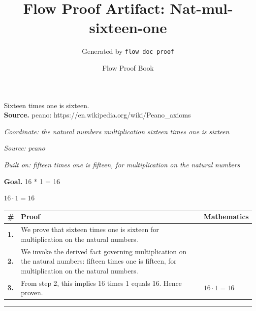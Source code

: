\documentclass[11pt]{article}
\title{Flow Proof Artifact: Nat-mul-sixteen-one}
\author{Generated by \texttt{flow doc proof}}
\date{Flow Proof Book}
\theoremstyle{definition}
\begin{document}
\maketitle
Sixteen times one is sixteen.\\[0.5em]
\textbf{Source.} peano: https://en.wikipedia.org/wiki/Peano\_axioms\\[0.5em]
\bigskip
{}\par
\smallskip\noindent\textit{Coordinate: the natural numbers \cdot multiplication \cdot sixteen times one is sixteen}\par
\smallskip\noindent\textit{Source: peano}\par
\smallskip\noindent\textit{Built on: fifteen times one is fifteen, for multiplication on the natural numbers}\par
\medskip
\noindent\textbf{Goal.} 16 * 1 = 16\par
\noindent$\displaystyle 16 \cdot 1 = 16$\par
\medskip
\noindent
\begin{tabular}{@{} >{\raggedright\arraybackslash}p{} >{\raggedright\arraybackslash}p{} >{\raggedleft\arraybackslash}p{} @{}}
\textbf{\#} & \textbf{Proof} & \textbf{Mathematics} \\
\midrule
\textbf{1.} & We prove that sixteen times one is sixteen for multiplication on the natural numbers. & \\[0.45em]
\textbf{2.} & We invoke the derived fact governing multiplication on the natural numbers: fifteen times one is fifteen, for multiplication on the natural numbers. & \\[0.45em]
\textbf{3.} & From step 2, this implies 16 times 1 equals 16. Hence proven. & $\displaystyle 16 \cdot 1 = 16$ \\[0.45em]
\bottomrule
\end{tabular}
\label{thm:Nat-multiplication-sixteen_times_one_is_sixteen}
\par\medskip\hrule
\end{document}
